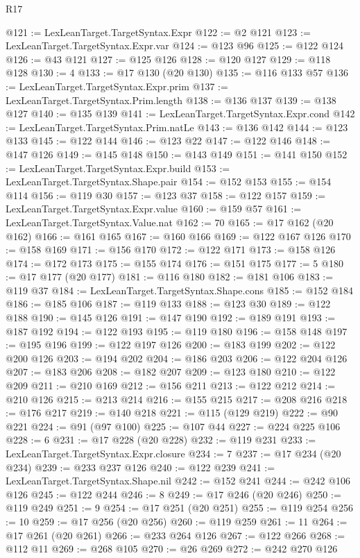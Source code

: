 \begin{lexlean}{R17}
\begin{coremodule}
{{{{{{{{{{{{{{{{{{{{{{{{{{{{{{{{{{{{{{{{{{{{{{{{{{{{{{{{{{{{{{{{{{{{{{{{{{{{{{{{{{{{{{{{{{{{{{{{{{{{{{{{{{{@121 := LexLeanTarget.TargetSyntax.Expr
@122 := @2 @121
@123 := LexLeanTarget.TargetSyntax.Expr.var
@124 := @123 @96
@125 := @122 @124
@126 := @43 @121
@127 := @125 @126
@128 := @120 @127
@129 := @118 @128
@130 := 4
@133 := @17 @130 (@20 @130)
@135 := @116 @133 @57
@136 := LexLeanTarget.TargetSyntax.Expr.prim
@137 := LexLeanTarget.TargetSyntax.Prim.length
@138 := @136 @137
@139 := @138 @127
@140 := @135 @139
@141 := LexLeanTarget.TargetSyntax.Expr.cond
@142 := LexLeanTarget.TargetSyntax.Prim.natLe
@143 := @136 @142
@144 := @123 @133
@145 := @122 @144
@146 := @123 @22
@147 := @122 @146
@148 := @147 @126
@149 := @145 @148
@150 := @143 @149
@151 := @141 @150
@152 := LexLeanTarget.TargetSyntax.Expr.build
@153 := LexLeanTarget.TargetSyntax.Shape.pair
@154 := @152 @153
@155 := @154 @114
@156 := @119 @30
@157 := @123 @37
@158 := @122 @157
@159 := LexLeanTarget.TargetSyntax.Expr.value
@160 := @159 @57
@161 := LexLeanTarget.TargetSyntax.Value.nat
@162 := 70
@165 := @17 @162 (@20 @162)
@166 := @161 @165
@167 := @160 @166
@169 := @122 @167 @126
@170 := @158 @169
@171 := @156 @170
@172 := @122 @171
@173 := @158 @126
@174 := @172 @173
@175 := @155 @174
@176 := @151 @175
@177 := 5
@180 := @17 @177 (@20 @177)
@181 := @116 @180
@182 := @181 @106
@183 := @119 @37
@184 := LexLeanTarget.TargetSyntax.Shape.cons
@185 := @152 @184
@186 := @185 @106
@187 := @119 @133
@188 := @123 @30
@189 := @122 @188
@190 := @145 @126
@191 := @147 @190
@192 := @189 @191
@193 := @187 @192
@194 := @122 @193
@195 := @119 @180
@196 := @158 @148
@197 := @195 @196
@199 := @122 @197 @126
@200 := @183 @199
@202 := @122 @200 @126
@203 := @194 @202
@204 := @186 @203
@206 := @122 @204 @126
@207 := @183 @206
@208 := @182 @207
@209 := @123 @180
@210 := @122 @209
@211 := @210 @169
@212 := @156 @211
@213 := @122 @212
@214 := @210 @126
@215 := @213 @214
@216 := @155 @215
@217 := @208 @216
@218 := @176 @217
@219 := @140 @218
@221 := @115 (@129 @219)
@222 := @90 @221
@224 := @91 (@97 @100)
@225 := @107 @44
@227 := @224 @225 @106
@228 := 6
@231 := @17 @228 (@20 @228)
@232 := @119 @231
@233 := LexLeanTarget.TargetSyntax.Expr.closure
@234 := 7
@237 := @17 @234 (@20 @234)
@239 := @233 @237 @126
@240 := @122 @239
@241 := LexLeanTarget.TargetSyntax.Shape.nil
@242 := @152 @241
@244 := @242 @106 @126
@245 := @122 @244
@246 := 8
@249 := @17 @246 (@20 @246)
@250 := @119 @249
@251 := 9
@254 := @17 @251 (@20 @251)
@255 := @119 @254
@256 := 10
@259 := @17 @256 (@20 @256)
@260 := @119 @259
@261 := 11
@264 := @17 @261 (@20 @261)
@266 := @233 @264 @126
@267 := @122 @266
@268 := @112 @11
@269 := @268 @105
@270 := @26 @269
@272 := @242 @270 @126
}}}}}}}}}}}}}}}}}}}}}}}}}}}}}}}}}}}}}}}}}}}}}}}}}}}}}}}}}}}}}}}}}}}}}}}}}}}}}}}}}}}}}}}}}}}}}}}}}}}}}}}}}}}
\end{coremodule}
\end{lexlean}
